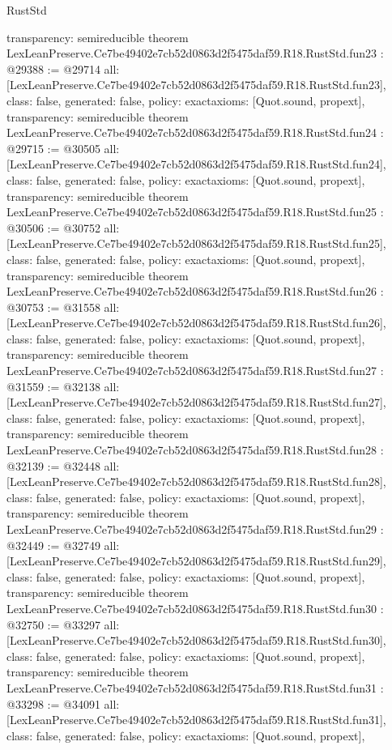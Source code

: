 \begin{lexlean}{RustStd}
\begin{coremodule}
{  transparency: semireducible
}
theorem LexLeanPreserve.Ce7be49402e7cb52d0863d2f5475daf59.R18.RustStd.fun23 : @29388 := @29714 {
  all: [LexLeanPreserve.Ce7be49402e7cb52d0863d2f5475daf59.R18.RustStd.fun23],
  class: false,
  generated: false,
  policy: exact{axioms: [Quot.sound, propext]},
  transparency: semireducible
}
theorem LexLeanPreserve.Ce7be49402e7cb52d0863d2f5475daf59.R18.RustStd.fun24 : @29715 := @30505 {
  all: [LexLeanPreserve.Ce7be49402e7cb52d0863d2f5475daf59.R18.RustStd.fun24],
  class: false,
  generated: false,
  policy: exact{axioms: [Quot.sound, propext]},
  transparency: semireducible
}
theorem LexLeanPreserve.Ce7be49402e7cb52d0863d2f5475daf59.R18.RustStd.fun25 : @30506 := @30752 {
  all: [LexLeanPreserve.Ce7be49402e7cb52d0863d2f5475daf59.R18.RustStd.fun25],
  class: false,
  generated: false,
  policy: exact{axioms: [Quot.sound, propext]},
  transparency: semireducible
}
theorem LexLeanPreserve.Ce7be49402e7cb52d0863d2f5475daf59.R18.RustStd.fun26 : @30753 := @31558 {
  all: [LexLeanPreserve.Ce7be49402e7cb52d0863d2f5475daf59.R18.RustStd.fun26],
  class: false,
  generated: false,
  policy: exact{axioms: [Quot.sound, propext]},
  transparency: semireducible
}
theorem LexLeanPreserve.Ce7be49402e7cb52d0863d2f5475daf59.R18.RustStd.fun27 : @31559 := @32138 {
  all: [LexLeanPreserve.Ce7be49402e7cb52d0863d2f5475daf59.R18.RustStd.fun27],
  class: false,
  generated: false,
  policy: exact{axioms: [Quot.sound, propext]},
  transparency: semireducible
}
theorem LexLeanPreserve.Ce7be49402e7cb52d0863d2f5475daf59.R18.RustStd.fun28 : @32139 := @32448 {
  all: [LexLeanPreserve.Ce7be49402e7cb52d0863d2f5475daf59.R18.RustStd.fun28],
  class: false,
  generated: false,
  policy: exact{axioms: [Quot.sound, propext]},
  transparency: semireducible
}
theorem LexLeanPreserve.Ce7be49402e7cb52d0863d2f5475daf59.R18.RustStd.fun29 : @32449 := @32749 {
  all: [LexLeanPreserve.Ce7be49402e7cb52d0863d2f5475daf59.R18.RustStd.fun29],
  class: false,
  generated: false,
  policy: exact{axioms: [Quot.sound, propext]},
  transparency: semireducible
}
theorem LexLeanPreserve.Ce7be49402e7cb52d0863d2f5475daf59.R18.RustStd.fun30 : @32750 := @33297 {
  all: [LexLeanPreserve.Ce7be49402e7cb52d0863d2f5475daf59.R18.RustStd.fun30],
  class: false,
  generated: false,
  policy: exact{axioms: [Quot.sound, propext]},
  transparency: semireducible
}
theorem LexLeanPreserve.Ce7be49402e7cb52d0863d2f5475daf59.R18.RustStd.fun31 : @33298 := @34091 {
  all: [LexLeanPreserve.Ce7be49402e7cb52d0863d2f5475daf59.R18.RustStd.fun31],
  class: false,
  generated: false,
  policy: exact{axioms: [Quot.sound, propext]},
}
\end{coremodule}
\end{lexlean}
